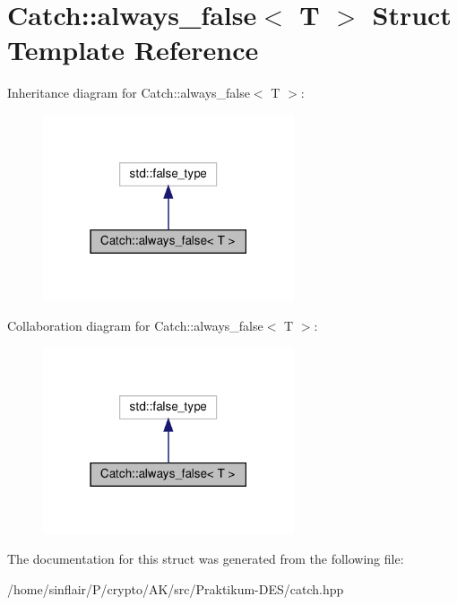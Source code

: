 \hypertarget{structCatch_1_1always__false}{}\section{Catch\+:\+:always\+\_\+false$<$ T $>$ Struct Template Reference}
\label{structCatch_1_1always__false}


Inheritance diagram for Catch\+:\+:always\+\_\+false$<$ T $>$\+:
\nopagebreak
\begin{figure}[H]
\begin{center}
\leavevmode
\includegraphics[width=210pt]{structCatch_1_1always__false__inherit__graph}
\end{center}
\end{figure}


Collaboration diagram for Catch\+:\+:always\+\_\+false$<$ T $>$\+:
\nopagebreak
\begin{figure}[H]
\begin{center}
\leavevmode
\includegraphics[width=210pt]{structCatch_1_1always__false__coll__graph}
\end{center}
\end{figure}


The documentation for this struct was generated from the following file\+:\begin{DoxyCompactItemize}
\item 
/home/sinflair/\+P/crypto/\+A\+K/src/\+Praktikum-\/\+D\+E\+S/catch.\+hpp\end{DoxyCompactItemize}
